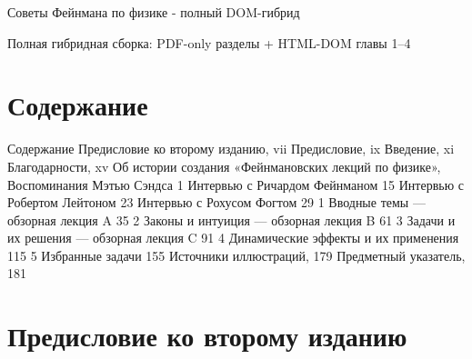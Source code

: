 \documentclass[11pt,oneside]{article}
\begin{document}
\tableofcontents


\begin{center}

{\Large Советы Фейнмана по физике - полный DOM-гибрид\par}

\vspace{4mm}

{\small Полная гибридная сборка: PDF-only разделы + HTML-DOM главы 1--4\par}

\end{center}

\bigskip

\clearpage


\section*{Содержание}



\label{tips-sec-0-содержание}


Содержание Предисловие ко второму изданию, vii Предисловие, ix Введение, xi Благодарности, xv Об истории создания «Фейнмановских лекций по физике», Воспоминания Мэтью Сэндса 1 Интервью с Ричардом Фейнманом 15 Интервью с Робертом Лейтоном 23 Интервью с Рохусом Фогтом 29 1 Вводные темы --- обзорная лекция A 35 2 Законы и интуиция --- обзорная лекция B 61 3 Задачи и их решения --- обзорная лекция C 91 4 Динамические эффекты и их применения 115 5 Избранные задачи 155 Источники иллюстраций, 179 Предметный указатель, 181\par



\clearpage


\section*{Предисловие ко второму изданию}



\label{tips-sec-1-предисловие-ко-второму-изданию}
\end{document}
